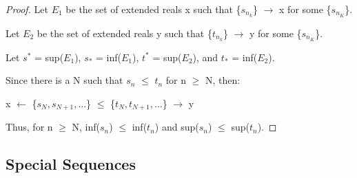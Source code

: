 	\begin{proof}
		Let $E_1$ be the set of extended reals x such that
		\{$s_{n_k}$\} $\rightarrow$ x for some \{$s_{n_K}$\}.

		Let $E_2$ be the set of extended reals y such that
		\{$t_{n_k}$\} $\rightarrow$ y for some \{$s_{n_K}$\}.

		Let $s^*$ = sup($E_1$), $s_*$ = inf($E_1$),
		$t^*$ = sup($E_2$), and $t_*$ = inf($E_2$).

		Since there is a N such that $s_n$ $\leq$ $t_n$ for n $\geq$ N,
		then:
		
		\hspace{1cm}
		x $\leftarrow$ \{$s_{N}, s_{N+1}, ... $\}
		$\leq$ \{$t_{N}, t_{N+1}, ... $\} $\rightarrow$ y

		Thus, for n $\geq$ N, inf($s_n$) $\leq$ inf($t_n$)
		and sup($s_n$) $\leq$ sup($t_n$).
	\end{proof}

	\vspace{0.5cm}





\subsection{ Special Sequences }

